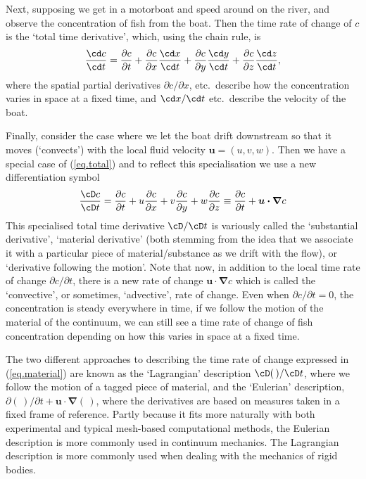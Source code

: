 \documentclass[a4paper,11pt]		{report}
\begin{document}
Next, supposing we get in a motorboat and speed around on the river,
and observe the concentration of fish from the boat. Then the time
rate of change of $c$ is the `total time derivative', which, using the
chain rule, is
\begin{equation}
\frac{\cd c}{\cd t} = \frac{\partial c}{\partial t}+
\frac{\partial c}{\partial x}\frac{\cd x}{\cd t}+
\frac{\partial c}{\partial y}\frac{\cd y}{\cd t}+
\frac{\partial c}{\partial z}\frac{\cd z}{\cd t},
\label{eq.total}
\end{equation}
where the spatial partial derivatives $\partial c/\partial x$, etc.\
describe how the concentration varies in space at a fixed time, and
$\cd x/\cd t$ etc.\ describe the velocity of the boat.

Finally, consider the case where we let the boat drift downstream so
that it moves (`convects') with the local fluid velocity $\bm{u} = (u,
v, w)$. Then we have a special case of (\ref{eq.total}) and to reflect
this specialisation we use a new differentiation symbol
\begin{equation}
\frac{\cD c}{\cD t} = \frac{\partial c}{\partial t}+
u\frac{\partial c}{\partial x}+
v\frac{\partial c}{\partial y}+
w\frac{\partial c}{\partial z}\equiv
\frac{\partial c}{\partial t}+\bm{u\cdot\nabla}c
\label{eq.material}
\end{equation}
This specialised total time derivative $\cD/\cD t$ is variously called
the `substantial derivative', `material derivative' (both stemming
from the idea that we associate it with a particular piece of
material/substance as we drift with the flow), or `derivative
following the motion'. Note that now, in addition to the local time
rate of change $\partial c/\partial t$, there is a new rate of change
$\bm{u\cdot\nabla}c$ which is called the `convective', or sometimes,
`advective', rate of change. Even when $\partial c/\partial t=0$, \ie
the concentration is steady everywhere in time, if we follow the
motion of the material of the continuum, we can still see a time rate
of change of fish concentration depending on how this varies in space
at a fixed time.

The two different approaches to describing the time rate of change
expressed in (\ref{eq.material}) are known as the `Lagrangian'
description $\cD(\,)/\cD t$, where we follow the motion of a tagged
piece of material, and the `Eulerian' description,
$\partial(\,)/\partial t+\bm{u\cdot\nabla}(\,)$, where the derivatives
are based on measures taken in a fixed frame of reference. Partly
because it fits more naturally with both experimental and typical
mesh-based computational methods, the Eulerian description is more
commonly used in continuum mechanics. The Lagrangian description is
more commonly used when dealing with the mechanics of rigid bodies.
\end{document}
